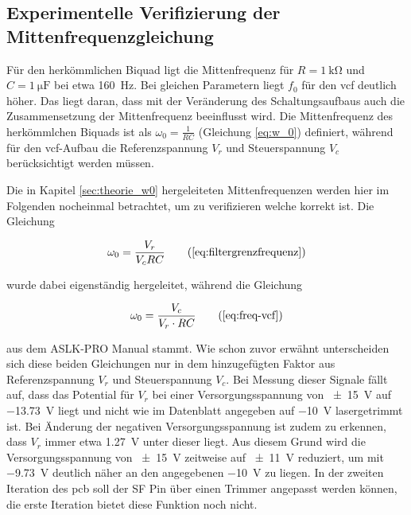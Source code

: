 \documentclass[../main_config.tex]{subfiles}
\begin{document}
\subsection*{Experimentelle Verifizierung der Mittenfrequenzgleichung}
\label{sec:veri_omega0}
Für den herkömmlichen Biquad ligt die Mittenfrequenz für $R= \SI{1}{\kilo\ohm}$ und $C= \SI{1}{\micro\farad}$ bei etwa \SI{160}{\hertz}. Bei gleichen Parametern liegt $f_0$ für den \gls{vcf} deutlich höher. Das liegt daran, dass mit der Veränderung des Schaltungsaufbaus auch die Zusammensetzung der Mittenfrequenz beeinflusst wird. Die Mittenfrequenz des herkömmlchen Biquads ist als $\omega_0 = \frac{1}{RC}$ (Gleichung \ref{eq:w_0}) definiert, während für den \gls{vcf}-Aufbau die Referenzspannung $V_r$ und Steuerspannung $V_c$ berücksichtigt werden müssen. \par
\medskip

Die in Kapitel \ref{sec:theorie_w0} hergeleiteten Mittenfrequenzen werden hier im Folgenden nocheinmal betrachtet, um zu verifizieren welche korrekt ist. Die Gleichung \par
\medskip

\begin{equation}
    \omega_0 = \frac{V_r}{V_cRC}
    \tag{\ref{eq:filtergrenzfrequenz}}
\end{equation}

wurde dabei eigenständig hergeleitet, während die Gleichung 

\begin{equation}
    \omega_0 = \frac{V_c}{V_r \cdot RC} 
    \tag{\ref{eq:freq-vcf}}
\end{equation}

aus dem ASLK-PRO Manual stammt. Wie schon zuvor erwähnt unterscheiden sich diese beiden Gleichungen nur in dem hinzugefügten Faktor aus Referenzspannung $V_r$ und Steuerspannung $V_c$. Bei Messung dieser Signale fällt auf, dass das Potential für $V_r$ bei einer Versorgungsspannung von \SI{\pm15}{\volt} auf \SI{-13.73}{\volt} liegt und nicht wie im Datenblatt angegeben auf \SI{-10}{\volt} lasergetrimmt ist. Bei Änderung der negativen Versorgungsspannung ist zudem zu erkennen, dass $V_r$ immer etwa \SI{1.27}{\volt} unter dieser liegt. Aus diesem Grund wird die Versorgungsspannung von \SI{\pm15}{\volt} zeitweise auf \SI{\pm11}{\volt} reduziert, um mit \SI{-9.73}{\volt} deutlich näher an den angegebenen \SI{-10}{\volt} zu liegen. In der zweiten Iteration des \gls{pcb} soll der SF Pin über einen Trimmer angepasst werden können, die erste Iteration bietet diese Funktion noch nicht.\par
\medskip  
\end{document}
